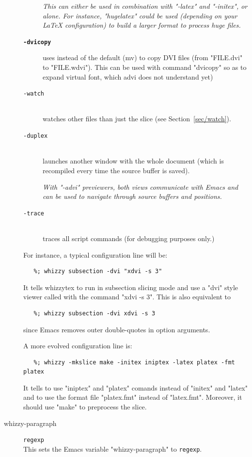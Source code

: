 \documentclass[12pt]{article}
\begin{document}
\begin{description}
\begin{description}
{\em This can either be used in combination with \lst"-latex" and
\lst"-initex", 
or alone. For instance,
\lst"hugelatex" could be used (depending on your {\LaTeX} configuration) to
build a larger format to process huge files.}
\label{configuration.tex}

\item[{\bf {\tt -dvicopy \arg{command}}}]\indent
\label {sec/dvicopy}

uses  instead of the default (mv) to copy DVI files
(from \lst"FILE.dvi" to \lst"FILE.wdvi"). This can be used with command
\lst"dvicopy" so as  to expand virtual font, which advi does not understand
yet) 

\item[\texttt{-watch}]\indent\\
watches other files than just the slice (see Section~\ref {sec/watch}).

\item[\texttt{-duplex}]\indent\\
launches another window with the whole document (which is
recompiled every time the source buffer is saved).

{\em With \lst"-advi" previewers, both views  communicate with Emacs and can be
used to navigate through source buffers and positions.}

\item[\texttt{-trace}]\indent\\
traces all script commands (for debugging purposes only.)
\label{configuration.trace}

\end{description}

For instance, a typical configuration line will be:
\begin{verbatim}
   %; whizzy subsection -dvi "xdvi -s 3"
\end{verbatim}
It tells whizzytex to run in subsection slicing mode and use a \lst"dvi"
style viewer called with the command
\lst"xdvi -s 3". This is also equivalent to
\begin{verbatim}
   %; whizzy subsection -dvi xdvi -s 3
\end{verbatim}
since Emacs removes outer double-quotes in option arguments. 

A more evolved configuration line is:
\begin{verbatim}
   %; whizzy -mkslice make -initex iniptex -latex platex -fmt platex
\end{verbatim}
It tells {\whizzy} to use \lst"iniptex" and \lst"platex" comands instead
of \lst"initex" and \lst"latex" and to use the format file \lst"platex.fmt" 
instead of \lst"latex.fmt". Moreover, it should use \lst"make" to preprocess
the slice.

\item[whizzy-paragraph] \texttt{regexp}\\
This sets the Emacs variable \lst"whizzy-paragraph" to \texttt{regexp}.
\end{description} 
\end{document}
